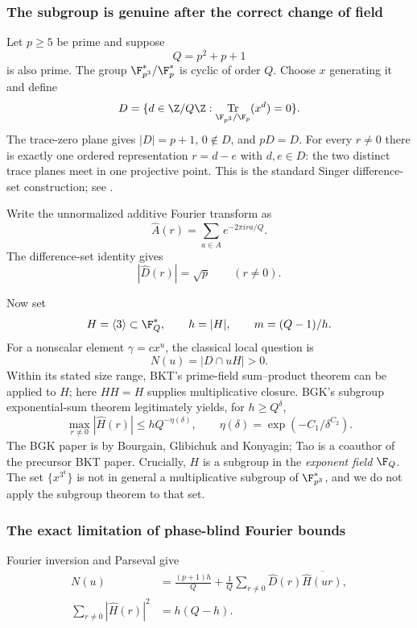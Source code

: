 \documentclass[11pt,a4paper]{article}
\theoremstyle{definition}\newtheorem{definition}[theorem]{Definition}
\theoremstyle{remark}\newtheorem{remark}[theorem]{Remark}
\DeclareMathOperator{\Tr}{Tr}\DeclareMathOperator{\tr}{tr}\DeclareMathOperator{\Nm}{N}
\begin{document}
\subsubsection{The subgroup is genuine after the correct change of field}

Let $p\ge5$ be prime and suppose
\[
 Q=p^2+p+1
\]
is also prime. The group $\F_{p^3}^*/\F_p^*$ is cyclic of order $Q$.
Choose $x$ generating it and define
\[
 D=\{d\in\Z/Q\Z:\Tr_{\F_{p^3}/\F_p}(x^d)=0\}.
\]
The trace-zero plane gives $|D|=p+1$, $0\notin D$, and $pD=D$.
For every $r\ne0$ there is exactly one ordered representation
$r=d-e$ with $d,e\in D$: the two distinct trace planes meet in one
projective point. This is the standard Singer difference-set
construction; see \cite{MRS}.

Write the unnormalized additive Fourier transform as
\[
 \widehat A(r)=\sum_{a\in A}e^{-2\pi ira/Q}.
\]
The difference-set identity gives
\begin{equation}\label{R18:eq:flat}
 |\widehat D(r)|=\sqrt p\qquad(r\ne0).
\end{equation}

Now set
\[
 H=\langle3\rangle\subset\F_Q^*,\qquad h=|H|,\qquad
 m=(Q-1)/h.
\]
For a nonscalar element $\gamma=cx^u$, the classical local question is
\begin{equation}\label{R18:eq:hit}
 N(u)=|D\cap uH|>0.
\end{equation}
Within its stated size range, BKT's prime-field sum--product theorem
\cite[Theorem 1.1]{R18-BKT} can be applied to $H$; here $HH=H$ supplies
multiplicative closure. BGK's subgroup exponential-sum
theorem \cite[Theorem 6]{R18-BGK} legitimately yields, for $h\ge Q^\delta$,
\[
 \max_{r\ne0}|\widehat H(r)|\le hQ^{-\eta(\delta)},\qquad
 \eta(\delta)=\exp(-C_1/\delta^{C_2}).
\]
The BGK paper is by Bourgain, Glibichuk and Konyagin; Tao is a coauthor
of the precursor BKT paper. Crucially, $H$ is a subgroup in the
\emph{exponent field} $\F_Q$. The set $\{x^{3^k}\}$ is not in
general a multiplicative subgroup of $\F_{p^3}^*$, and we do not apply
the subgroup theorem to that set.

\subsubsection{The exact limitation of phase-blind Fourier bounds}

Fourier inversion and Parseval give
\begin{align}
 N(u)&=\frac{(p+1)h}{Q}
 +\frac1Q\sum_{r\ne0}\widehat D(r)
                       \overline{\widehat H(ur)},\label{R18:eq:mixed}\\
 \sum_{r\ne0}|\widehat H(r)|^2&=h(Q-h).\label{R18:eq:parseval}
\end{align}
\end{document}
